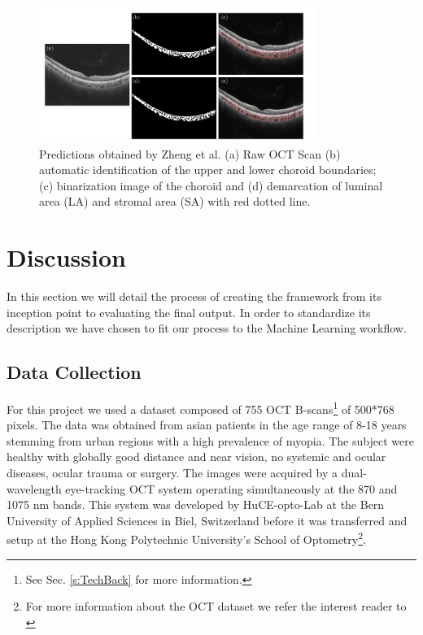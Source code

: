 \documentclass[12pt,a4paper]{scrartcl}
\begin{document}
\begin{figure}[H]
    \centering
    \includegraphics[width=0.8\textwidth]{./images/choroidal-segmentation-zheng.png}
    \caption{Predictions obtained by Zheng et al. (a) Raw OCT Scan (b) automatic identification of the upper and lower choroid boundaries; (c) binarization image of the choroid and (d) demarcation of luminal area (LA) and stromal area (SA) with red dotted line. \cite{Zheng2020}}
\end{figure}





\section{Discussion}\label{s:Discussion}

In this section we will detail the process of creating the framework from its inception point to evaluating the final output. In order to standardize its description we have chosen to fit our process to the Machine Learning workflow. 

\subsection{Data Collection}
For this project we used a dataset composed of 755 OCT B-scans\footnote{See Sec. \ref{s:TechBack} for more information.} of 500*768 pixels. The data was obtained from asian patients in the age range of 8-18 years stemming from urban regions with a high prevalence of myopia. The subject were healthy with globally good distance and near vision, no systemic and ocular diseases, ocular trauma or surgery\cite{Ronchetti2019}. The images were acquired by a dual-wavelength eye-tracking OCT system operating simultaneously at the 870 and 1075 nm bands. This system was developed by HuCE-opto-Lab at the Bern University of Applied Sciences in Biel, Switzerland \cite{Ronchetti2019}  before it was transferred and setup at the Hong Kong Polytechnic University’s School of Optometry\footnote{For more information about the OCT dataset we refer the interest reader to \cite{Ronchetti2019}}.
\end{document}
